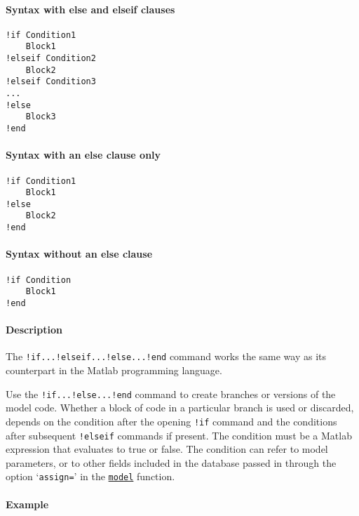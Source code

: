


	\paragraph{Syntax with else and elseif
clauses}

\begin{verbatim}
!if Condition1
    Block1
!elseif Condition2
    Block2
!elseif Condition3
...
!else
    Block3
!end
\end{verbatim}

\paragraph{Syntax with an else clause
only}

\begin{verbatim}
!if Condition1
    Block1
!else
    Block2
!end
\end{verbatim}

\paragraph{Syntax without an else
clause}

\begin{verbatim}
!if Condition
    Block1
!end
\end{verbatim}

\paragraph{Description}

The \texttt{!if...!elseif...!else...!end} command works the same way as
its counterpart in the Matlab programming language.

Use the \texttt{!if...!else...!end} command to create branches or
versions of the model code. Whether a block of code in a particular
branch is used or discarded, depends on the condition after the opening
\texttt{!if} command and the conditions after subsequent
\texttt{!elseif} commands if present. The condition must be a Matlab
expression that evaluates to true or false. The condition can refer to
model parameters, or to other fields included in the database passed in
through the option `\texttt{assign=}' in the
\href{model/model}{\texttt{model}} function.

\paragraph{Example}

